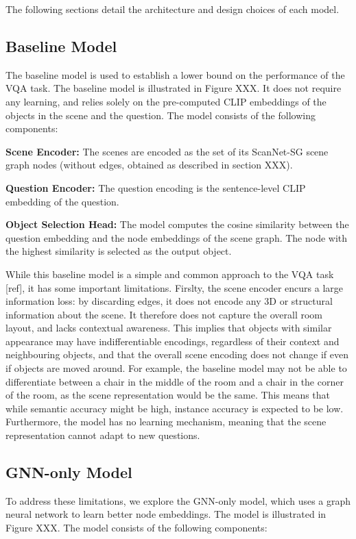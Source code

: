 The following sections detail the architecture and design choices of each model.

\subsection{Baseline Model}
The baseline model is used to establish a lower bound on the performance of the VQA task. The baseline model is illustrated in Figure XXX. It does not require any learning, and relies solely on the pre-computed CLIP embeddings of the objects in the scene and the question. The model consists of the following components:

\textbf{Scene Encoder:} The scenes are encoded as the set of its ScanNet-SG scene graph nodes (without edges, obtained as described in section XXX).

\textbf{Question Encoder:} The question encoding is the sentence-level CLIP embedding of the question.

\textbf{Object Selection Head:} The model computes the cosine similarity between the question embedding and the node embeddings of the scene graph. The node with the highest similarity is selected as the output object.

While this baseline model is a simple and common approach to the VQA task [ref], it has some important limitations. Firslty, the scene encoder encurs a large information loss: by discarding edges, it does not encode any 3D or structural information about the scene. It therefore does not capture the overall room layout, and lacks contextual awareness. This implies that objects with similar appearance may have indifferentiable encodings, regardless of their context and neighbouring objects, and that the overall scene encoding does not change if even if objects are moved around. For example, the baseline model may not be able to differentiate between a chair in the middle of the room and a chair in the corner of the room, as the scene representation would be the same. This means that while semantic accuracy might be high, instance accuracy is expected to be low. Furthermore, the model has no learning mechanism, meaning that the scene representation cannot adapt to new questions.

\subsection{GNN-only Model}
To address these limitations, we explore the GNN-only model, which uses a graph neural network to learn better node embeddings. The model is illustrated in Figure XXX. The model consists of the following components:

